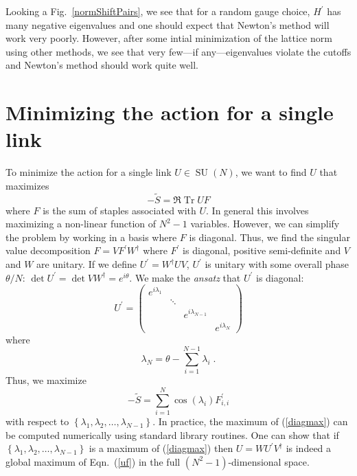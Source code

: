 \documentclass[preprint,aps,prd]{revtex4-2}
\newcommand{\be}{\begin{equation}}
\newcommand{\eq}{\end{equation}}
\DeclareMathOperator{\SU}{SU}
\DeclareMathOperator{\Tr}{Tr}
\begin{document}
Looking a Fig.~\ref{normShiftPairs}, we see that for a random
gauge choice, $H^\prime$ has many
negative eigenvalues and one should
expect that Newton's method will work very poorly.
However, after some intial minimization of the lattice
norm using other methods, we see that very few---if any---eigenvalues
violate the cutoffs and Newton's method should work quite well.


\section{Minimizing the action for a single link}

\label{linkmax}
To minimize the action for a single link $U\in\SU(N)$,
we want to find $U$ that maximizes
%
\be
-\tilde{S} = \Re\Tr U F \label{uf}
\eq
where $F$ is the sum of staples associated with $U$.
In general this involves maximizing a non-linear function of $N^2-1$
variables.  However, we can simplify the problem by working
in a basis where $F$ is diagonal.  Thus, we find the singular
value decomposition $F = V F^\prime W^\dag$ where $F^\prime$ is diagonal,
positive semi-definite and $V$ and $W$ are unitary.
If we define $U^\prime=W^\dag U V$, $U^\prime$ is unitary with some overall
phase $\theta/N$: $\det U^\prime = \det V W^\dag = e^{i \theta}$.
We make the {\em ansatz} that $U^\prime$ is diagonal:
\be
U^\prime = \begin{pmatrix}
  e^{i \lambda_1} & & & \\
  & \ddots & & \\
  & & e^{i \lambda_{N-1}} & \\
  & & & e^{i \lambda_N} \end{pmatrix}
\eq
where
\be
\lambda_N = \theta - \sum_{i=1}^{N-1} \lambda_i \; .
\eq
Thus, we maximize
\be
-\tilde{S} = %
    \sum_{i=1}^N \cos\left(\lambda_i\right) F_{i,i}^\prime \label{diagmax}
\eq
with respect to $\left\{\lambda_1, \lambda_2, \ldots, \lambda_{N-1}\right\}$.
In practice, the maximum of (\ref{diagmax}) can be computed numerically
using standard library routines.
One can show that if $\left\{\lambda_1, \lambda_2, \ldots, \lambda_{N-1}\right\}$ is a maximum of
(\ref{diagmax}) then $U = W U^\prime V^\dag$ is indeed a global maximum
of Eqn.~(\ref{uf}) in the full $(N^2-1)$-dimensional space.

\end{document}
